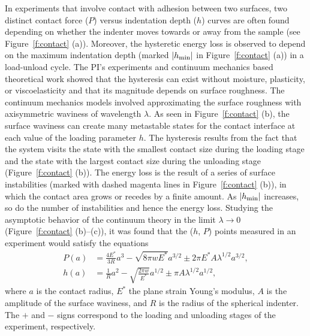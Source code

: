 \documentclass[10pt,letterpaper]{article}
\begin{document}
    In experiments that involve contact with adhesion between two surfaces, two distinct contact force ($P$) versus indentation depth ($h$) curves are often found depending on whether the indenter moves towards or away from the sample (see Figure~\ref{f:contact} (a)).
    Moreover, the hysteretic energy loss is observed to depend on the maximum indentation depth (marked $|h_{\rm min}|$ in Figure~\ref{f:contact} (a)) in a load-unload cycle.
    The PI's experiments \cite{kesari2010role} and continuum mechanics based theoretical work \cite{kesari2011effective} showed that the hysteresis can exist without moisture, plasticity, or viscoelasticity and that its magnitude depends on surface roughness.
    The continuum mechanics models involved approximating the surface roughness with axisymmetric waviness of wavelength $\lambda$.
    As seen in Figure~\ref{f:contact} (b), the surface waviness can create many metastable states for the contact interface at each value of the loading parameter $h$.
    The hysteresis results from the fact that the system visits the state with the smallest contact size during the loading stage and the state with the largest contact size during the unloading stage (Figure~\ref{f:contact} (b)).
    The energy loss is the result of a series of surface instabilities (marked with dashed magenta lines in Figure~\ref{f:contact} (b)), in which the contact area grows or recedes by a finite amount.
    As $|h_{\rm min}|$ increases, so do the number of instabilities and hence the energy loss.
    Studying the asymptotic behavior of the continuum theory in the limit $\lambda \to 0$(Figure~\ref{f:contact} (b)--(c)), it was found that the ($h$, $P$) points measured in an experiment would satisfy the equations
    \begin{subequations}
    \label{eq:P-h}
    \begin{align}
    P(a) &= \frac{4E^*}{3R}a^3 - \sqrt{8\pi w E^*} a^{3/2} \pm 2\pi E^* A \lambda^{1/2} a^{3/2}, \label{eq:P}\\
    h(a) &= \frac{1}{R}a^2 - \sqrt{\frac{2\pi w}{E^*}}a^{1/2} \pm \pi A \lambda^{1/2} a^{1/2}, \label{eq:h}
    \end{align}
    \end{subequations}
    where $a$ is the contact radius, $E^*$ the plane strain Young's modulus, $A$ is the amplitude of the surface
    waviness, and $R$ is the radius of the spherical indenter.
    The $+$ and $-$ signs correspond to the loading and unloading stages of the experiment, respectively.
\end{document}
